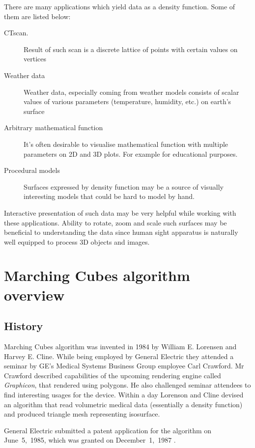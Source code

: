 There are many applications which yield data as a density function. Some of them
are listed below:
\begin{description}
	\item[CT\footnotemark scan.]
		Result of such scan is a discrete lattice of points with certain
		values on vertices
	\item[Weather data]
		Weather data, especially coming from weather models consists of
		scalar values of various parameters (temperature, humidity, etc.)
		on earth's surface
	\item[Arbitrary mathematical function]
		It's often desirable to visualise mathematical function with
		multiple parameters on 2D and 3D plots. For example for
		educational purposes.
	\item[Procedural models]
		Surfaces expressed by density function may be a source of
		visually interesting models that could be hard to model by hand.
\end{description}

Interactive presentation of such data may be very helpful while working with
these applications. Ability to rotate, zoom and scale such surfaces may be
beneficial to understanding the data since human sight apparatus is naturally
well equipped to process 3D objects and images.

\section{Marching Cubes algorithm overview}
\subsection{History \parencite{mchist}}
Marching Cubes algorithm was invented in 1984 by William E. Lorensen and Harvey
E. Cline. While being employed by General Electric they attended a seminar by
GE's Medical Systems Business Group employee Carl Crawford. Mr Crawford
described capabilities of the upcoming rendering engine called \emph{Graphicon},
that rendered using polygons. He also challenged seminar attendees to find
interesting usages for the device. Within a day Lorenson and Cline devised an
algorithm that read volumetric medical data (essentially a density function) and
produced triangle mesh representing isosurface.

General Electric submitted a patent application for the algorithm on
June~5,~1985, which was granted on December~1,~1987 \parencite{mcpatent}.

